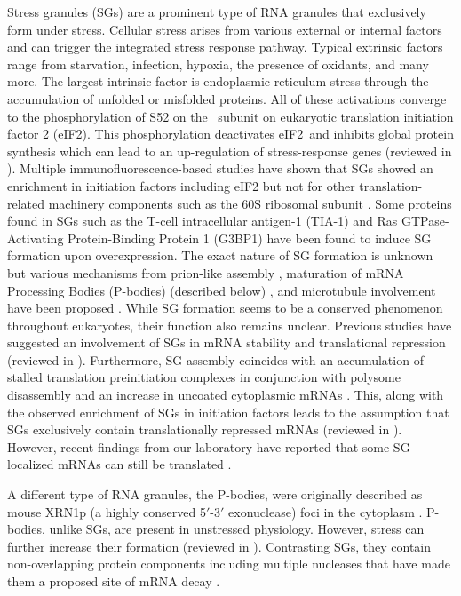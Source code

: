 Stress granules (SGs) are a prominent type of RNA granules that exclusively form under stress.
Cellular stress arises from various external or internal factors and can trigger the integrated stress response pathway.
Typical extrinsic factors range from starvation, infection, hypoxia, the presence of oxidants, and many more.
The largest intrinsic factor is endoplasmic reticulum stress through the accumulation of unfolded or misfolded proteins.
All of these activations converge to the phosphorylation of S52 on the \textalpha\ subunit on eukaryotic translation initiation factor 2 (eIF2\textalpha).
This phosphorylation deactivates eIF2\textalpha\ and inhibits global protein synthesis which can lead to an up-regulation of stress-response genes (reviewed in \cite{pakoszebrucka_integrated_2016}).
Multiple immunofluorescence-based studies have shown that SGs showed an enrichment in initiation factors including eIF2 but not for other translation-related machinery components such as the 60S ribosomal subunit \cite{kimball_mammalian_2003}.
Some proteins found in SGs such as the T-cell intracellular antigen-1 (TIA-1) \cite{kedersha_rna-binding_1999} and Ras GTPase-Activating Protein-Binding Protein 1 (G3BP1) \cite{tourriere_rasgap-associated_2003} have been found to induce SG formation upon overexpression.
The exact nature of SG formation is unknown but various mechanisms from prion-like assembly \cite{gilks_stress_2004, shattuck_prion-like_2019}, maturation of mRNA Processing Bodies (P-bodies) (described below) \cite{buchan_p_2008}, and microtubule involvement have been proposed \cite{ivanov_disruption_2003}.
While SG formation seems to be a conserved phenomenon throughout eukaryotes, their function also remains unclear.
Previous studies have suggested an involvement of SGs in mRNA stability and translational repression (reviewed in \cite{buchan_eukaryotic_2009}).
Furthermore, SG assembly coincides with an accumulation of stalled translation preinitiation complexes in conjunction with polysome disassembly and an increase in uncoated cytoplasmic mRNAs \cite{panas_mechanistic_2016}.
This, along with the observed enrichment of SGs in initiation factors leads to the assumption that SGs exclusively contain translationally repressed mRNAs (reviewed in \cite{thomas_rna_2011}).
However, recent findings from our laboratory have reported that some SG-localized mRNAs can still be translated \cite{mateju_single-molecule_2020}.

A different type of RNA granules, the P-bodies, were originally described as mouse XRN1p (a highly conserved 5$'$-3$'$ exonuclease) foci in the cytoplasm \cite{bashkirov_mouse_1997}.
P-bodies, unlike SGs, are present in unstressed physiology.
However, stress can further increase their formation (reviewed in \cite{parker_p_2007}).
Contrasting SGs, they contain non-overlapping protein components including multiple nucleases that have made them a proposed site of mRNA decay \cite{sheth_decapping_2003}.

